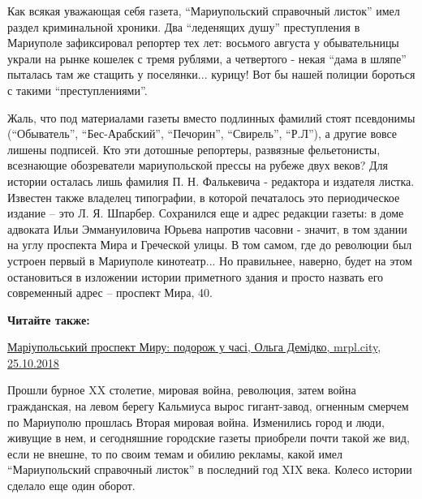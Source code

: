 Как всякая уважающая себя газета, \enquote{Мариупольский справочный листок} имел раздел
криминальной хроники. Два \enquote{леденящих душу} преступления в Мариуполе
зафиксировал репортер тех лет: восьмого августа у обывательницы украли на рынке
кошелек с тремя рублями, а четвертого - некая \enquote{дама в шляпе} пыталась там же
стащить у поселянки... курицу! Вот бы нашей полиции бороться с такими
\enquote{преступлениями}.

Жаль, что под материалами газеты вместо подлинных фамилий стоят псевдонимы
(\enquote{Обыватель}, \enquote{Бес-Арабский}, \enquote{Печорин}, \enquote{Свирель}, \enquote{Р.Л}), а другие вовсе
лишены подписей. Кто эти дотошные репортеры, развязные фельетонисты, всезнающие
обозреватели мариупольской прессы на рубеже двух веков? Для истории осталась
лишь фамилия П. Н. Фалькевича - редактора и издателя листка. Известен также
владелец типографии, в которой печаталось это периодическое издание – это Л. Я.
Шпарбер. Сохранился еще и адрес редакции газеты: в доме адвоката Ильи
Эммануиловича Юрьева напротив часовни - значит, в том здании на углу проспекта
Мира и Греческой улицы. В том самом, где до революции был устроен первый в
Мариуполе кинотеатр... Но правильнее, наверно, будет на этом остановиться в
изложении истории приметного здания и просто назвать его современный адрес –
проспект Мира, 40.

\textbf{Читайте также:} 

\begin{minipage}{0.9\textwidth}
\href{https://mrpl.city/blogs/view/prospekt-miru-podorozh-u-chasi}{%
Маріупольський проспект Миру: подорож у часі, Ольга Демідко, mrpl.city, 25.10.2018}
\end{minipage}

Прошли бурное XX столетие, мировая война, революция, затем война гражданская,
на левом берегу Кальмиуса вырос гигант-завод, огненным смерчем по Мариуполю
прошлась Вторая мировая война. Изменились город и люди, живущие в нем, и
сегодняшние городские газеты приобрели почти такой же вид, если не внешне, то
по своим темам и обилию рекламы, какой имел \enquote{Мариупольский справочный листок} в
последний год XIX века. Колесо истории сделало еще один оборот.
